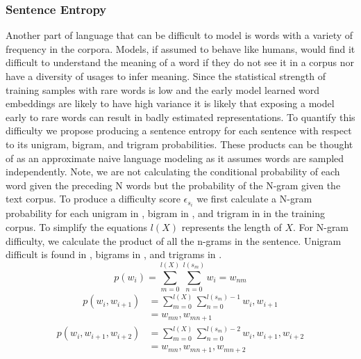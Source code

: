\subsubsection{Sentence Entropy}
Another part of language that can be difficult to model is words with a variety of frequency in the corpora. Models, if assumed to behave like humans, would find it difficult to understand the meaning of a word if they do not see it in a corpus nor have a diversity of usages to infer meaning. Since the statistical strength of training samples with rare words is low and the early model learned word embeddings are likely to have high variance it is likely that exposing a model early to rare words can result in badly estimated representations. To quantify this difficulty we propose producing a sentence entropy for each sentence with respect to its unigram, bigram, and trigram probabilities. These products can be thought of as an approximate naive language modeling as it assumes words are sampled independently. Note, we are not calculating the conditional probability of each word given the preceding N words but the probability of the N-gram given the text corpus. To produce a difficulty score $\epsilon_{s_i}$ we first calculate a N-gram probability for each unigram in , bigram in , and trigram in in the training corpus. To simplify the equations $l(X)$ represents the length of $X$. For N-gram difficulty, we calculate the product of all the n-grams in the sentence. Unigram difficult is found in , bigrams in , and trigrams in . 
\begin{equation}
    p(w_i) = \sum_{m=0} ^ {l(X)} \sum_{n=0}^{l(s_m)} w_i = w_{nm}
\label{equation:unigramprob}
\end{equation}
\begin{equation}
\begin{split}
    p(w_{i}, w_{i+1})  & = \sum_{m=0} ^ {l(X)} \sum_{n=0}^{l(s_m)-1} w_i, w_{i+1} \\
    & = w_{mn},w_{mn+1}
\end{split}
\label{equation:bigramprob}
\end{equation}
\begin{equation}
\begin{split}
    p(w_{i}, w_{i+1}, w_{i+2}) & = \sum_{m=0} ^ {l(X)} \sum_{n=0}^{l(s_m)-2} w_i, w_{i+1},w_{i+2} \\
    & = w_{mn},w_{mn+1},w_{mn+2}
\end{split}
\label{equation:trigramprob}
\end{equation}

